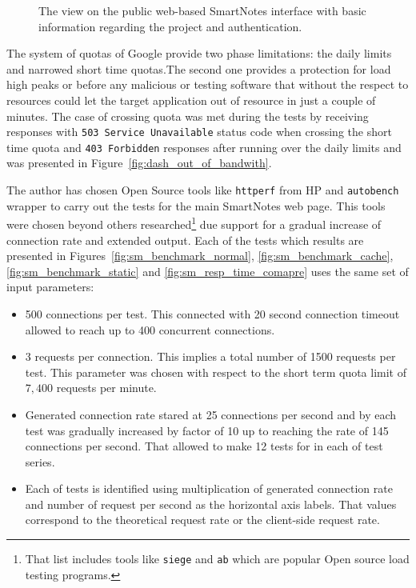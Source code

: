 \begin{figure}[ht]
\begin{center}
  \end{center}
  \caption{The view on the public web-based SmartNotes interface with basic information regarding the project and authentication.}
  \label{fig:sn_dash_view}
\end{figure}
The system of quotas of  Google provide two phase limitations: the daily limits and narrowed short time quotas.The second one provides a protection for load high peaks or before any malicious or testing software that without the respect to resources could let the target application out of resource in just a couple of minutes. The case of crossing quota was met during the tests by receiving responses with \texttt{503 Service Unavailable} status code when crossing the short time quota and \texttt{403 Forbidden} responses after running over the daily limits and was presented in Figure~\ref{fig:dash_out_of_bandwith}.

The author has chosen Open Source tools like \texttt{httperf} from HP and \texttt{autobench} wrapper to carry out the tests for the main SmartNotes web page. This tools were chosen beyond others researched\footnote{That list includes tools like \texttt{siege} and \texttt{ab} which are popular Open source load testing programs.} due support for a gradual increase of connection rate and extended output. Each of the tests which results are presented in Figures~\ref{fig:sm_benchmark_normal}, \ref{fig:sm_benchmark_cache}, \ref{fig:sm_benchmark_static} and \ref{fig:sm_resp_time_comapre} uses the same set of input parameters:
\begin{itemize}
	\item{500 connections per test. This connected with 20 second connection timeout allowed to reach up to 400 concurrent connections.  }
	\item{3 requests per connection. This implies a total number of 1500 requests per test. This parameter was chosen with respect to the short term quota limit of $7, 400$ requests per minute.}
	\item{Generated connection rate stared at 25 connections per second and by each test was gradually increased by factor of 10 up to reaching the rate of 145 connections per second. That allowed to make 12 tests for in each of test series.}
	\item{Each of tests is identified using multiplication of generated connection rate and number of request per second as the horizontal axis labels. That values correspond to the theoretical request rate or the client-side request rate.}
\end{itemize}

